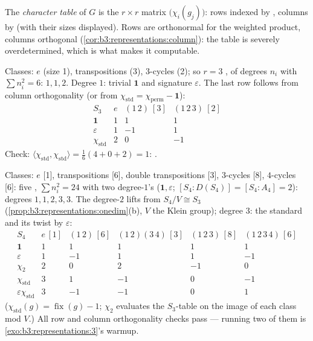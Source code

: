 \begin{definition}\label{def:b3:representations:table}
The \emph{character table} of $G$ is the
$r \times r$ matrix $\bigl(\chi_i(g_j)\bigr)$: rows indexed by
 , columns by  (with their
sizes displayed). Rows are orthonormal for the weighted product,
columns orthogonal (\cref{cor:b3:representations:column}): the
table is severely overdetermined, which is what makes it
computable.
\end{definition}

\begin{example}\label{ex:b3:representations:s3}
Classes: $e$ (size 1), transpositions (3), $3$-cycles (2); so $r
= 3$ , of degrees $n_i$ with $\sum n_i^2 = 6$: $1, 1,
2$. Degree $1$: trivial $\mathbf 1$ and signature $\varepsilon$.
The last row follows from column orthogonality (or from
$\chi_{\mathrm{std}} = \chi_{\mathrm{perm}} - \mathbf 1$):
\[
\begin{array}{c|ccc}
S_3 & e & (1\,2)\ [3] & (1\,2\,3)\ [2]\\
\hline
\mathbf 1 & 1 & 1 & 1\\
\varepsilon & 1 & -1 & 1\\
\chi_{\mathrm{std}} & 2 & 0 & -1
\end{array}
\]
Check: $\langle\chi_{\mathrm{std}},\chi_{\mathrm{std}}\rangle =
\frac{1}{6}(4 + 0 + 2) = 1$: .
\end{example}

\begin{example}\label{ex:b3:representations:s4}
Classes: $e$ [1], transpositions [6], double transpositions [3],
$3$-cycles [8], $4$-cycles [6]: five , $\sum n_i^2 =
24$ with two degree-$1$'s ($\mathbf 1, \varepsilon$; $[S_4 :
D(S_4)] = [S_4 : A_4] = 2$): degrees $1, 1, 2, 3, 3$. The
degree-$2$ lifts from $S_4/V \cong S_3$
(\cref{prop:b3:representations:onedim}(b), $V$ the Klein group);
degree $3$: the standard  and its twist by
$\varepsilon$:
\[
\begin{array}{c|ccccc}
S_4 & e\,[1] & (1\,2)\,[6] & (1\,2)(3\,4)\,[3] &
(1\,2\,3)\,[8] & (1\,2\,3\,4)\,[6]\\
\hline
\mathbf 1 & 1 & 1 & 1 & 1 & 1\\
\varepsilon & 1 & -1 & 1 & 1 & -1\\
\chi_2 & 2 & 0 & 2 & -1 & 0\\
\chi_{\mathrm{std}} & 3 & 1 & -1 & 0 & -1\\
\varepsilon\chi_{\mathrm{std}} & 3 & -1 & -1 & 0 & 1
\end{array}
\]
($\chi_{\mathrm{std}}(g) = \operatorname{fix}(g) - 1$;
$\chi_2$ evaluates the $S_3$-table on the image of each class
mod $V$.) All row and column orthogonality checks pass ---
running two of them is \cref{exo:b3:representations:3}'s warmup.
\end{example}

